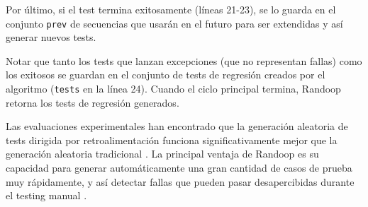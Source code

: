 Por último, si el test termina exitosamente (líneas 21-23), se lo guarda en el
conjunto \texttt{prev} de secuencias que usarán en el futuro para ser extendidas
y así generar nuevos tests. 

Notar que tanto los tests que lanzan excepciones (que no representan fallas) como los 
exitosos se guardan en el conjunto de tests de regresión creados por el
algoritmo (\texttt{tests} en la línea 24). Cuando el ciclo principal termina,
\textsf{Randoop} retorna los tests de regresión generados.

Las evaluaciones experimentales han encontrado que la generación aleatoria de tests dirigida 
por retroalimentación funciona significativamente mejor que la generación
aleatoria tradicional \cite{Pacheco07,Pacheco08}.
La principal ventaja de \textsf{Randoop} es su capacidad para generar
automáticamente una gran cantidad de casos de prueba muy rápidamente, y así 
detectar fallas que pueden pasar desapercibidas durante el testing
manual \cite{Pacheco07,Pacheco08}.








%




